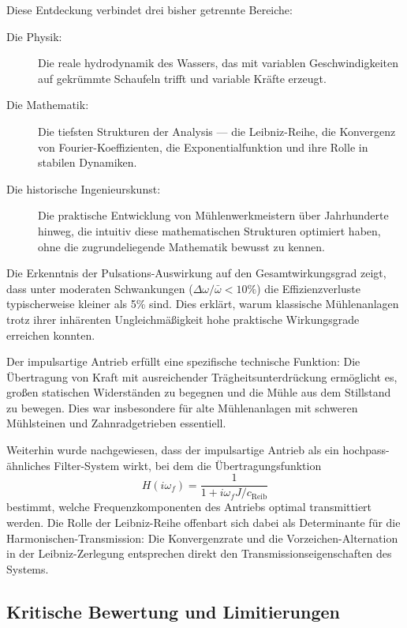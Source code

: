 \documentclass[a4paper,12pt]{article}
\theoremstyle{definition}
\begin{document}
Diese Entdeckung verbindet drei bisher getrennte Bereiche:

\begin{description}
  \item[Die Physik:] Die reale hydrodynamik des Wassers, das mit variablen Geschwindigkeiten auf gekrümmte Schaufeln trifft und variable Kräfte erzeugt.
  
  \item[Die Mathematik:] Die tiefsten Strukturen der Analysis --- die Leibniz-Reihe, die Konvergenz von Fourier-Koeffizienten, die Exponentialfunktion und ihre Rolle in stabilen Dynamiken.
  
  \item[Die historische Ingenieurskunst:] Die praktische Entwicklung von Mühlenwerkmeistern über Jahrhunderte hinweg, die intuitiv diese mathematischen Strukturen optimiert haben, ohne die zugrundeliegende Mathematik bewusst zu kennen.
\end{description}

Die Erkenntnis der Pulsations-Auswirkung auf den Gesamtwirkungsgrad zeigt, dass unter moderaten Schwankungen ($\Delta\omega / \bar{\omega} < 10\%$) die Effizienzverluste typischerweise kleiner als 5\% sind. Dies erklärt, warum klassische Mühlenanlagen trotz ihrer inhärenten Ungleichmäßigkeit hohe praktische Wirkungsgrade erreichen konnten.

Der impulsartige Antrieb erfüllt eine spezifische technische Funktion: Die Übertragung von Kraft mit ausreichender Trägheitsunterdrückung ermöglicht es, großen statischen Widerständen zu begegnen und die Mühle aus dem Stillstand zu bewegen. Dies war insbesondere für alte Mühlenanlagen mit schweren Mühlsteinen und Zahnradgetrieben essentiell.

Weiterhin wurde nachgewiesen, dass der impulsartige Antrieb als ein hochpass-ähnliches Filter-System wirkt, bei dem die Übertragungsfunktion
\begin{equation}
  H(i\omega_f) = \frac{1}{1 + i\omega_f J/c_{\text{Reib}}}
\end{equation}
bestimmt, welche Frequenzkomponenten des Antriebs optimal transmittiert werden. Die Rolle der Leibniz-Reihe offenbart sich dabei als Determinante für die Harmonischen-Transmission: Die Konvergenzrate und die Vorzeichen-Alternation in der Leibniz-Zerlegung entsprechen direkt den Transmissionseigenschaften des Systems.

\subsection{Kritische Bewertung und Limitierungen}
\end{document}

